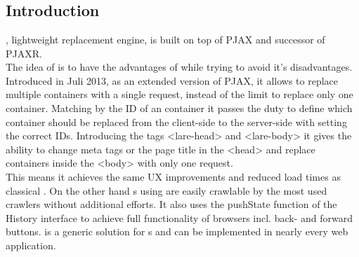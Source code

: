\section{\lare{}\label{chap:lare}}
\subsection{Introduction\label{sec:lare_introduction}}
\lare{}, lightweight \ajax{} replacement engine, is built on top of PJAX and successor of PJAXR.
\\
The idea of \lare{} is to have the advantages of \ajax{} while trying to avoid it's disadvantages.
Introduced in Juli 2013, as an extended version of PJAX, it allows to replace multiple containers with a single request, instead of the limit to replace only one container.
Matching by the ID of an container it passes the duty to define which container should be replaced from the client-side to the server-side with setting the correct IDs.
Introducing the tags <lare-head> and <lare-body> it gives the ability to change meta tags or the page title in the <head> and replace containers inside the <body> with only one request.
\\
This means it achieves the same UX improvements and reduced load times as classical \ajax{}.
On the other hand \singlePageApplication{}s using \lare{} are easily crawlable by the most used crawlers without additional efforts.
It also uses the pushState function of the History interface to achieve full functionality of browsers incl. back- and forward buttons.
\lare{} is a generic solution for \singlePageApplication{}s and can be implemented in nearly every web application.

